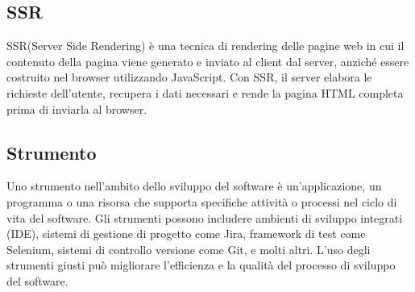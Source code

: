\subsection*{SSR} 
SSR(Server Side Rendering) è una tecnica di rendering delle pagine web in cui il contenuto della pagina viene generato e inviato al client dal server, anziché essere costruito nel browser utilizzando JavaScript. Con SSR, il server elabora le richieste dell'utente, recupera i dati necessari e rende la pagina HTML completa prima di inviarla al browser.
\subsection*{Strumento} 
Uno strumento nell'ambito dello sviluppo del software è un'applicazione, un programma o una risorsa che supporta specifiche attività o processi nel ciclo di vita del software. Gli strumenti possono includere ambienti di sviluppo integrati (IDE), sistemi di gestione di progetto come Jira, framework di test come Selenium, sistemi di controllo versione come Git, e molti altri. L'uso degli strumenti giusti può migliorare l'efficienza e la qualità del processo di sviluppo del software. 
